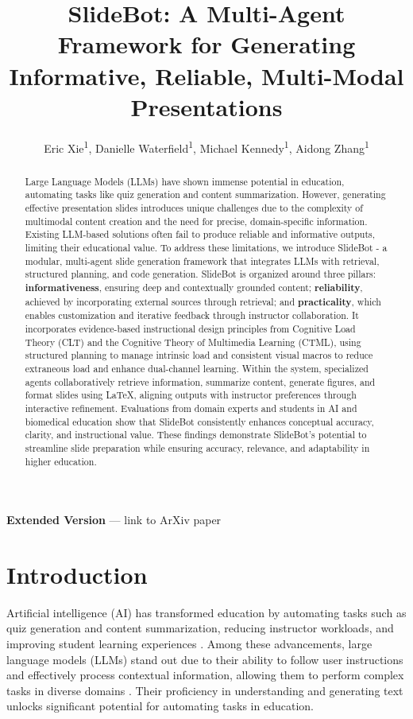 \documentclass[letterpaper]{article} %
\title{SlideBot: A Multi-Agent Framework for Generating Informative, Reliable, Multi-Modal Presentations}
\author {
    Eric Xie\textsuperscript{\rm 1},
    Danielle Waterfield\textsuperscript{\rm 1},
    Michael Kennedy\textsuperscript{\rm 1},
    Aidong Zhang\textsuperscript{\rm 1}
}
\begin{document}
\maketitle

\begin{abstract}

Large Language Models (LLMs) have shown immense potential in education, automating tasks like quiz generation and content summarization. However, generating effective presentation slides introduces unique challenges due to the complexity of multimodal content creation and the need for precise, domain-specific information. Existing LLM-based solutions often fail to produce reliable and informative outputs, limiting their educational value. To address these limitations, we introduce SlideBot - a modular, multi-agent slide generation framework that integrates LLMs with retrieval, structured planning, and code generation. SlideBot is organized around three pillars: \textbf{informativeness}, ensuring deep and contextually grounded content; \textbf{reliability}, achieved by incorporating external sources through retrieval; and \textbf{practicality}, which enables customization and iterative feedback through instructor collaboration. It incorporates evidence-based instructional design principles from Cognitive Load Theory (CLT) and the Cognitive Theory of Multimedia Learning (CTML), using structured planning to manage intrinsic load and consistent visual macros to reduce extraneous load and enhance dual-channel learning. Within the system, specialized agents collaboratively retrieve information, summarize content, generate figures, and format slides using \LaTeX, aligning outputs with instructor preferences through interactive refinement. Evaluations from domain experts and students in AI and biomedical education show that SlideBot consistently enhances conceptual accuracy, clarity, and instructional value. These findings demonstrate SlideBot's potential to streamline slide preparation while ensuring accuracy, relevance, and adaptability in higher education.


\end{abstract}

\textbf{Extended Version} --- link to ArXiv paper 

\section{Introduction}

Artificial intelligence (AI) has transformed education by automating tasks such as quiz generation and content summarization, reducing instructor workloads, and improving student learning experiences \citep{elkins2024how, agrawal2024cyberq, fagbohun2024beyond}. Among these advancements, large language models (LLMs) stand out due to their ability to follow user instructions \citep{ouyang2022training} and effectively process contextual information, allowing them to perform complex tasks in diverse domains \citep{achiam2023gpt,touvron2023llama2}. Their proficiency in understanding and generating text unlocks significant potential for automating tasks in education.
\end{document}
